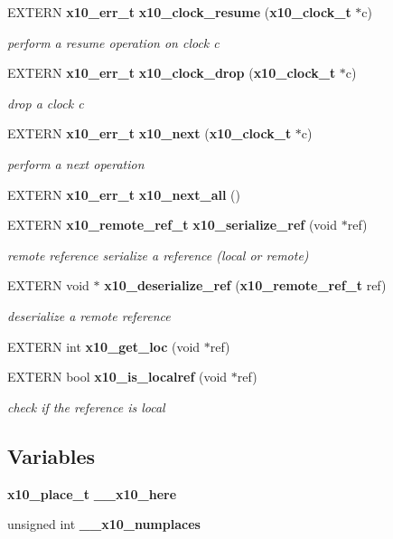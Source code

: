\begin{CompactItemize}
EXTERN {\bf x10\_\-err\_\-t} {\bf x10\_\-clock\_\-resume} ({\bf x10\_\-clock\_\-t} $\ast$c)
\begin{CompactList}\small\item\em perform a resume operation on clock c \item\end{CompactList}\item 
EXTERN {\bf x10\_\-err\_\-t} {\bf x10\_\-clock\_\-drop} ({\bf x10\_\-clock\_\-t} $\ast$c)
\begin{CompactList}\small\item\em drop a clock c \item\end{CompactList}\item 
EXTERN {\bf x10\_\-err\_\-t} {\bf x10\_\-next} ({\bf x10\_\-clock\_\-t} $\ast$c)
\begin{CompactList}\small\item\em perform a next operation \item\end{CompactList}\item 
EXTERN {\bf x10\_\-err\_\-t} {\bf x10\_\-next\_\-all} ()
\item 
EXTERN {\bf x10\_\-remote\_\-ref\_\-t} {\bf x10\_\-serialize\_\-ref} (void $\ast$ref)
\begin{CompactList}\small\item\em remote reference serialize a reference (local or remote) \item\end{CompactList}\item 
EXTERN void $\ast$ {\bf x10\_\-deserialize\_\-ref} ({\bf x10\_\-remote\_\-ref\_\-t} ref)
\begin{CompactList}\small\item\em deserialize a remote reference \item\end{CompactList}\item 
EXTERN int {\bf x10\_\-get\_\-loc} (void $\ast$ref)
\item 
EXTERN bool {\bf x10\_\-is\_\-localref} (void $\ast$ref)
\begin{CompactList}\small\item\em check if the reference is local \item\end{CompactList}\end{CompactItemize}
\subsection*{Variables}
\begin{CompactItemize}
\item 
{\bf x10\_\-place\_\-t} {\bf \_\-\_\-x10\_\-here}
\item 
unsigned int {\bf \_\-\_\-x10\_\-numplaces}
\end{CompactItemize}


